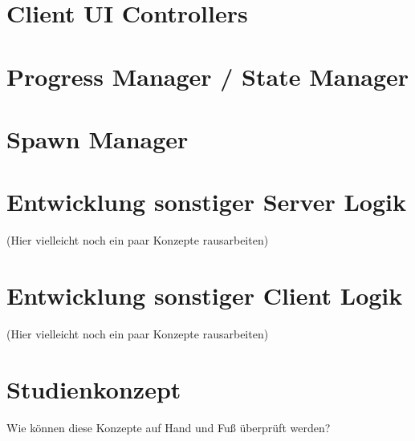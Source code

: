 \section{Client UI Controllers}

\section{Progress Manager / State Manager}

\section{Spawn Manager}

\section{Entwicklung sonstiger Server Logik}

(Hier vielleicht noch ein paar Konzepte rausarbeiten)

\section{Entwicklung sonstiger Client Logik}

(Hier vielleicht noch ein paar Konzepte rausarbeiten)

\section{Studienkonzept}

Wie können diese Konzepte auf Hand und Fuß überprüft werden?

